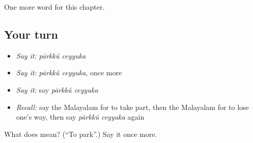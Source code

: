 \begin{grammarlens}[title={What you've built}]
One more word for this chapter.
\end{grammarlens}

\subsection*{Your turn}
\begin{itemize}
\raggedright
  \item \emph{Say it:} \emph{pārkkŭ ceyyuka}
  \item \emph{Say it:} \emph{pārkkŭ ceyyuka}, once more
  \item \emph{Say it:} say \emph{pārkkŭ ceyyuka}
  \item \emph{Recall:} say the Malayalam for to take part, then the Malayalam for to lose one's way, then say \emph{pārkkŭ ceyyuka} again
\end{itemize}

\begin{tcolorbox}[breakable,colback=teal!4,colframe=teal!35!black,title={Before you move on}]
What does   mean? (\textquotedblleft{}To park\textquotedblright{}.) Say it once more.
\end{tcolorbox}
